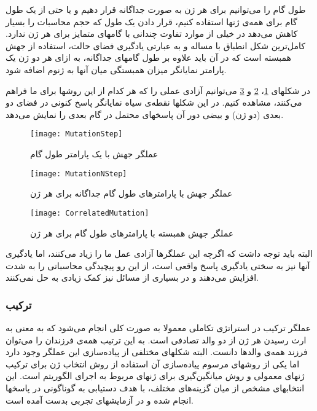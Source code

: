 \documentclass{report}
\begin{document}
طول گام را می‌توانیم برای هر ژن به صورت جداگانه قرار دهیم و یا حتی از یک طول گام برای همه‌ی ژنها استفاده کنیم، قرار دادن یک طول که حجم محاسبات را بسیار کاهش می‌دهد در خیلی از موارد تفاوت چندانی با گامهای متمایز برای هر ژن ندارد. کامل‌ترین شکل انطباق با مساله و به عبارتی یادگیری فضای حالت، استفاده از جهش همبسته  است که در آن باید علاوه بر طول گامهای جداگانه، به ازای هر دو ژن یک پارامتر نمایانگر میزان همبستگی میان آنها به ژنوم اضافه شود.

در شکلهای \ref{fMutationStep}، \ref{fMutationNStep} و \ref{fCorrelatedMutation} می‌توانیم آزادی عملی را که هر کدام از این روشها برای ما فراهم می‌کنند، مشاهده کنیم. در این شکلها نقطه‌ی سیاه نمایانگر پاسخ کنونی در فضای دو بعدی (دو ژن) و بیضی دور آن پاسخهای محتمل در گام بعدی را نمایش می‌دهد.

\begin{figure}[!h] \centerline{\texttt{[image: MutationStep]}} \caption{\label{fMutationStep}
 عملگر جهش با یک پارامتر طول گام
 } \end{figure}
 
\begin{figure}[!h] \centerline{\texttt{[image: MutationNStep]}} \caption{\label{fMutationNStep}
 عملگر جهش با پارامترهای طول گام جداگانه برای هر ژن
 } \end{figure}
 
\begin{figure}[!h] \centerline{\texttt{[image: CorrelatedMutation]}} \caption{\label{fCorrelatedMutation}
 عملگر جهش همبسته با پارامترهای طول گام برای هر ژن
 } \end{figure}
 
  البته باید توجه داشت که اگرچه این عملگرها آزادی عمل ما را زیاد می‌کنند، اما یادگیری آنها نیز به سختی یادگیری پاسخ واقعی است، از این رو پیچیدگی محاسباتی را به شدت افزایش می‌دهند و در بسیاری از مسائل نیز کمک زیادی به حل نمی‌کنند.

\subsubsection{ترکیب}
عملگر ترکیب در استراتژی تکاملی معمولا به صورت کلی انجام می‌شود که به معنی به ارث رسیدن هر ژن از دو والد تصادفی است. به این ترتیب همه‌ی فرزندان را می‌توان فرزند همه‌ی والدها دانست. البته شکلهای مختلفی از پیاده‌سازی این عملگر وجود دارد اما یکی از روشهای مرسوم پیاده‌سازی آن استفاده از روش انتخاب ژن برای ترکیب ژنهای معمولی و روش میانگین‌گیری برای ژنهای مربوط به اجرای الگوریتم است. این انتخابهای مشخص از میان گزینه‌های مختلف، با هدف دستیابی به گوناگونی در پاسخها انجام شده و در آزمایشهای تجربی بدست آمده است.
\end{document}
